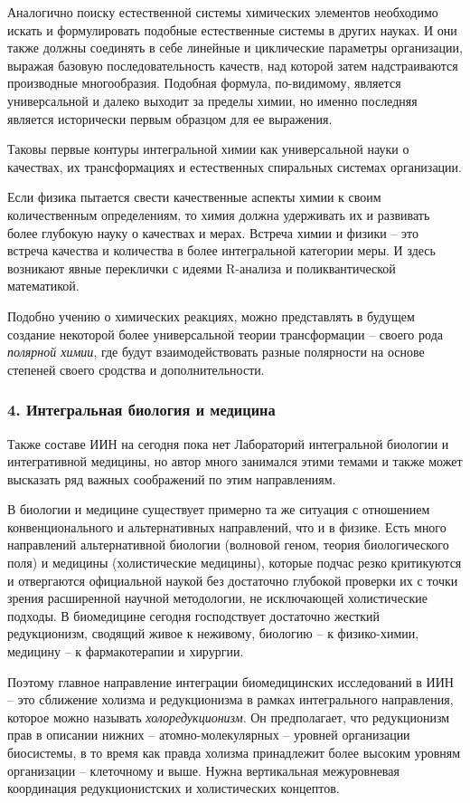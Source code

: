     Аналогично поиску естественной системы химических элементов необходимо искать и формулировать подобные естественные системы в других науках. И они также должны соединять в себе линейные и циклические параметры организации, выражая базовую последовательность качеств, над которой затем надстраиваются производные многообразия. Подобная формула, по-видимому, является универсальной и далеко выходит за пределы химии, но именно последняя является исторически первым образцом для ее выражения.

    Таковы первые контуры интегральной химии как универсальной науки о качествах, их трансформациях и естественных спиральных системах организации.

    Если физика пытается свести качественные аспекты химии к своим количественным определениям, то химия должна удерживать их и развивать более глубокую науку о качествах и мерах. Встреча химии и физики – это встреча качества и количества в более интегральной категории меры. И здесь возникают явные переклички с идеями R-анализа и поликвантической математикой.

    Подобно учению о химических реакциях, можно представлять в будущем создание некоторой более универсальной теории трансформации – своего рода \textit{полярной химии}, где будут взаимодействовать разные полярности на основе степеней своего сродства и дополнительности.

    \subsubsection*{4. Интегральная биология и медицина}
    Также составе ИИН на сегодня пока нет Лабораторий интегральной биологии и интегративной медицины, но автор много занимался этими темами и также может высказать ряд важных соображений по этим направлениям.

    В биологии и медицине существует примерно та же ситуация с отношением конвенционального и альтернативных направлений, что и в физике. Есть много направлений альтернативной биологии (волновой геном, теория биологического поля) и медицины (холистические медицины), которые подчас резко критикуются и отвергаются официальной наукой без достаточно глубокой проверки их с точки зрения расширенной научной методологии, не исключающей холистические подходы. В биомедицине сегодня господствует достаточно жесткий редукционизм, сводящий живое к неживому, биологию – к физико-химии, медицину – к фармакотерапии и хирургии.

    Поэтому главное направление интеграции биомедицинских исследований в ИИН – это сближение холизма и редукционизма в рамках интегрального направления, которое можно называть \textit{холоредукционизм}. Он предполагает, что редукционизм прав в описании нижних – атомно-молекулярных – уровней организации биосистемы, в то время как правда холизма принадлежит более высоким уровням организации – клеточному и выше. Нужна вертикальная межуровневая координация редукционистских и холистических концептов.

